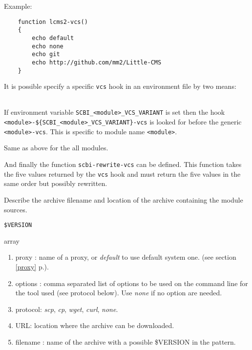 \documentclass[a4paper,12pt,twoside]{article}
\newcommand{\code}[1]{\texttt{#1}}
\renewcommand{\emph}[1]{\textit{#1}}
\newcommand{\seeref}[1]{see section \ref{#1} p.\pageref{#1}}
\begin{document}
\begin{description}[font=\large\texttt]
	Example:
	\begin{lstlisting}
	function lcms2-vcs()
	{
		echo default
		echo none
		echo git
		echo http://github.com/mm2/Little-CMS
	}
	\end{lstlisting}

	It is possible specify a specific \code{vcs} hook in an environment file by two means:

	\begin{description}[style=standard]
		\item[\code{SCBI\_<module>\_VCS\_VARIANT}] \hfill \\
		If environment variable \code{SCBI\_<module>\_VCS\_VARIANT} is set then the hook \\ \code{<module>-\$\{SCBI\_<module>\_VCS\_VARIANT\}-vcs} is looked for before the generic \code{<module>-vcs}. This is specific to module name \code{<module>}.

		\item[\code{SCBI\_VCS\_VARIANT}] Same as above for the all modules.
	\end{description}

	And finally the function \code{scbi-rewrite-vcs} can be defined. This function takes the five values returned by the \code{vcs} hook and must return the five values in the same order but possibly rewritten.

	\item[<module>{[}-<variant>{]}-archive] \label{hookarchive}Describe the archive filename and location of the archive containing the module sources.
	\begin{description}[font=\textit,style=standard]
		\item[parameter] \tabto{2cm} \code{\$VERSION}
		\item[return] \tabto{2cm} array
		\begin{enumerate}
		\item proxy : name of a proxy, or \emph{default} to use default system one. (\seeref{proxy}).
		\item options : comma separated list of options to be used on the command line for the tool used (see protocol below). Use \emph{none} if no option are needed.
		\item protocol: \emph{scp}, \emph{cp}, \emph{wget}, \emph{curl}, \emph{none}.
		\item URL: location where the archive can be downloaded.
		\item filename : name of the archive with a possible \$VERSION in the pattern.
		\end{enumerate}
	\end{description}


\end{description}
\end{document}
